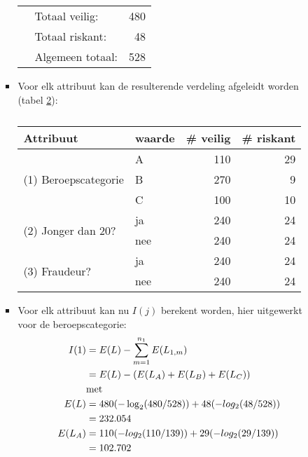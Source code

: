 \begin{itemize}
\begin{itemize}
\begin{itemize}
\begin{table}[ht]
\begin{tabular}{| c c c c | r |}
							\hline		
							\multicolumn{2}{|r}{}&\multicolumn{2}{l}{Totaal veilig:}	 & 480	 \\
							\multicolumn{2}{|r}{}&\multicolumn{2}{l}{Totaal riskant:}	 & 48	 \\
							\multicolumn{2}{|r}{}&\multicolumn{2}{l}{Algemeen totaal:}	 & 528	\\
							\hline		
						\end{tabular}
						\caption{}
						\label{table:example}
					\end{table}
					\item Voor elk attribuut kan de resulterende verdeling afgeleidt worden (tabel \ref{table:resulterende_verdeling}):
					\begin{table}[ht]
						\centering
						\begin{tabular}{|l | l |rr|}
							\hline	
							Attribuut & waarde & \# veilig & \# riskant \\
							\hline	
							\multirow{3}{*}{(1) Beroepscategorie} & A & 110 & 29 \\
							& B & 270 & 9  \\
							& C & 100 & 10 \\
							\hline	
							\multirow{2}{*}{(2) Jonger dan 20?} & ja & 240 & 24 \\
							& nee & 240 & 24 \\
							\hline	
							\multirow{2}{*}{(3) Fraudeur?} & ja & 240 & 24 \\
							& nee & 240 & 24 \\
							\hline			
						\end{tabular}
						\caption{}
						\label{table:resulterende_verdeling}
					\end{table}
					\item Voor elk attribuut kan nu $I(j)$ berekent worden, hier uitgewerkt voor de beroepscategorie:	
					\begin{equation*}
						\begin{split}
							I(1) & = E(L) - \sum_{m = 1}^{n_1} E(L_{1, m})\\ 
							     & = E(L) - (E(L_A) + E(L_B) + E(L_C)) \\	
							     & \hbox{met} \\
							     E(L) & = 480(-\log_2(480/528)) + 48(-log_2(48/528)) \\
							          & = 232.054 \\
							     E(L_A) & = 110(-log_2(110/139)) + 29(-log_2(29/139)) \\
							            & = 102.702 \\

\end{split}
\end{equation*}
\end{itemize}
\end{itemize}
\end{itemize}
